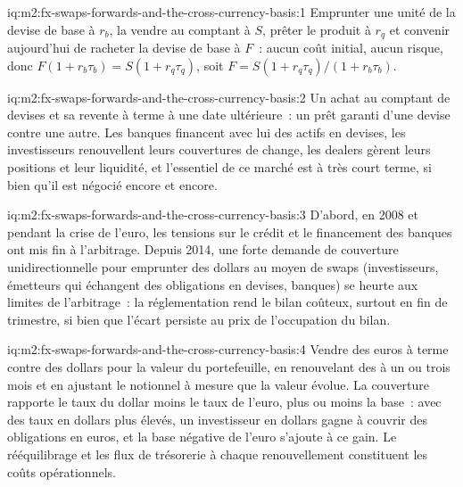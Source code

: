 \begin{solution}{iq:m2:fx-swaps-forwards-and-the-cross-currency-basis:1}
Emprunter une unité de la devise de base à $r_b$, la vendre au comptant à $S$, prêter
le produit à $r_q$ et convenir aujourd'hui de racheter la devise de base à $F$~: aucun coût initial,
aucun risque, donc $F(1 + r_b\tau_b) = S(1 + r_q\tau_q)$, soit
$F = S(1 + r_q\tau_q)/(1 + r_b\tau_b)$.
\end{solution}

\begin{solution}{iq:m2:fx-swaps-forwards-and-the-cross-currency-basis:2}
Un achat au comptant de devises et sa revente à terme à une date ultérieure~: un prêt
garanti d'une devise contre une autre. Les banques financent avec lui des actifs en devises, les investisseurs
renouvellent leurs couvertures de change, les dealers gèrent leurs positions et leur liquidité, et
l'essentiel de ce marché est à très court terme, si bien qu'il est négocié encore et encore.
\end{solution}

\begin{solution}{iq:m2:fx-swaps-forwards-and-the-cross-currency-basis:3}
D'abord, en 2008 et pendant la crise de l'euro, les tensions sur le crédit et le financement des banques ont
mis fin à l'arbitrage. Depuis 2014, une forte demande de couverture unidirectionnelle pour emprunter des dollars
au moyen de swaps (investisseurs, émetteurs qui échangent des obligations en devises, banques) se heurte aux limites
de l'arbitrage~: la réglementation rend le bilan coûteux, surtout en fin de trimestre,
si bien que l'écart persiste au prix de l'occupation du bilan.
\end{solution}

\begin{solution}{iq:m2:fx-swaps-forwards-and-the-cross-currency-basis:4}
Vendre des euros à terme contre des dollars pour la valeur du portefeuille, en renouvelant des  à un
ou trois mois et en ajustant le notionnel à mesure que la valeur évolue. La couverture
rapporte le taux du dollar moins le taux de l'euro, plus ou moins la base~: avec des taux en dollars plus élevés,
un investisseur en dollars gagne à couvrir des obligations en euros, et la base négative de l'euro
s'ajoute à ce gain. Le rééquilibrage et les flux de trésorerie à chaque renouvellement
constituent les coûts opérationnels.
\end{solution}

